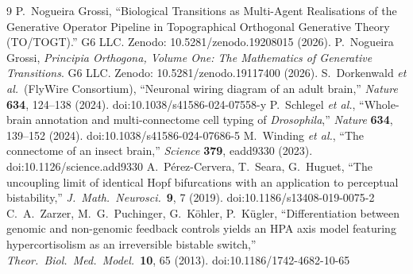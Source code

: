 \documentclass[11pt,a4paper]{article}
\theoremstyle{definition}
\theoremstyle{remark}
\begin{document}
\begin{thebibliography}{9}
 P.~Nogueira Grossi, ``Biological Transitions as Multi-Agent Realisations of the Generative Operator Pipeline in Topographical Orthogonal Generative Theory (TO/TOGT).'' G6 LLC. Zenodo: 10.5281/zenodo.19208015 (2026).
 P.~Nogueira Grossi, \textit{Principia Orthogona, Volume One: The Mathematics of Generative Transitions}. G6 LLC. Zenodo: 10.5281/zenodo.19117400 (2026).
 S.~Dorkenwald \textit{et al.}\ (FlyWire Consortium), ``Neuronal wiring diagram of an adult brain,'' \textit{Nature} \textbf{634}, 124--138 (2024). doi:10.1038/s41586-024-07558-y
 P.~Schlegel \textit{et al.}, ``Whole-brain annotation and multi-connectome cell typing of \textit{Drosophila},'' \textit{Nature} \textbf{634}, 139--152 (2024). doi:10.1038/s41586-024-07686-5
 M.~Winding \textit{et al.}, ``The connectome of an insect brain,'' \textit{Science} \textbf{379}, eadd9330 (2023). doi:10.1126/science.add9330
 A.~P\'erez-Cervera, T.~Seara, G.~Huguet, ``The uncoupling limit of identical Hopf bifurcations with an application to perceptual bistability,'' \textit{J.\ Math.\ Neurosci.}\ \textbf{9}, 7 (2019). doi:10.1186/s13408-019-0075-2
 C.~A.~Zarzer, M.~G.~Puchinger, G.~K\"ohler, P.~K\"ugler, ``Differentiation between genomic and non-genomic feedback controls yields an HPA axis model featuring hypercortisolism as an irreversible bistable switch,'' \textit{Theor.\ Biol.\ Med.\ Model.}\ \textbf{10}, 65 (2013). doi:10.1186/1742-4682-10-65
\end{thebibliography}
\end{document}
